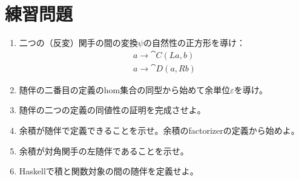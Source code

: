 \section{練習問題}

\begin{enumerate}
  \tightlist
  \item
        二つの（反変）関手の間の変換$\psi$の自然性の正方形を導け：
        \begin{gather*}
          a \to \cat{C}(L a, b) \\
          a \to \cat{D}(a, R b)
        \end{gather*}
  \item
        随伴の二番目の定義のhom集合の同型から始めて余単位$\varepsilon$を導け。
  \item
        随伴の二つの定義の同値性の証明を完成させよ。
  \item
        余積が随伴で定義できることを示せ。余積のfactorizerの定義から始めよ。
  \item
        余積が対角関手の左随伴であることを示せ。
  \item
        Haskellで積と関数対象の間の随伴を定義せよ。
\end{enumerate}
